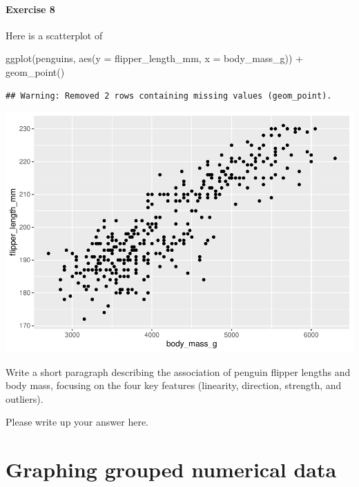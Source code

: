 \documentclass[
]{book}
\newenvironment{Shaded}{\begin{snugshade}}{\end{snugshade}}
\newcommand{\AttributeTok}[1]{\textcolor[rgb]{0.77,0.63,0.00}{#1}}
\newcommand{\FunctionTok}[1]{\textcolor[rgb]{0.00,0.00,0.00}{#1}}
\newcommand{\NormalTok}[1]{#1}
\newcommand{\SpecialCharTok}[1]{\textcolor[rgb]{0.00,0.00,0.00}{#1}}
\begin{document}
\hypertarget{exercise-8}{%
\paragraph*{Exercise 8}\label{exercise-8}}

Here is a scatterplot of

\begin{Shaded}
\begin{Highlighting}[]
\FunctionTok{ggplot}\NormalTok{(penguins, }\FunctionTok{aes}\NormalTok{(}\AttributeTok{y =}\NormalTok{ flipper\_length\_mm, }\AttributeTok{x =}\NormalTok{ body\_mass\_g)) }\SpecialCharTok{+}
    \FunctionTok{geom\_point}\NormalTok{()}
\end{Highlighting}
\end{Shaded}

\begin{verbatim}
## Warning: Removed 2 rows containing missing values (geom_point).
\end{verbatim}

\includegraphics{intro_stats_files/figure-latex/unnamed-chunk-104-1.pdf}

Write a short paragraph describing the association of penguin flipper lengths and body mass, focusing on the four key features (linearity, direction, strength, and outliers).

Please write up your answer here.

\hypertarget{numerical-graphing-grouped}{%
\section{Graphing grouped numerical data}\label{numerical-graphing-grouped}}
\end{document}
